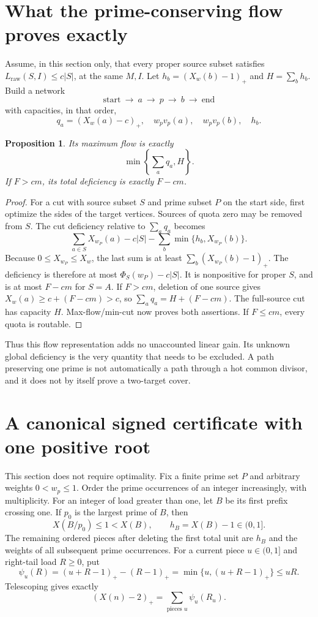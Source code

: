 \documentclass[11pt,a4paper]{article}
\newtheorem{proposition}[theorem]{Proposition}
\newcommand{\pos}[1]{(#1)_+}
\newcommand{\Ph}{\Phi}
\newcommand{\raw}{L_{\mathrm{raw}}}
\begin{document}
\section{What the prime-conserving flow proves exactly}
Assume, in this section only, that every proper source subset satisfies
\(\raw(S,I)\le c|S|\), at the same \(M,I\).
Let \(h_b=\pos{X_w(b)-1}\) and \(H=\sum_bh_b\).
Build a network
\[
 \text{start}\ \longrightarrow\ a\ \longrightarrow\ p\
 \longrightarrow\ b\ \longrightarrow\ \text{end}
\]
with capacities, in that order,
\[
 q_a=\pos{X_w(a)-c},\quad
 w_pv_p(a),\quad w_pv_p(b),\quad h_b.
\]
\begin{proposition}\label{prop:flow}
Its maximum flow is exactly
\[
 \min\left\{\sum_aq_a,H\right\}.
\]
If \(F>cm\), its total deficiency is exactly \(F-cm\).
\end{proposition}
\begin{proof}
For a cut with source subset \(S\) and prime subset \(P\) on the
start side, first optimize the sides of the target vertices.
Sources of quota zero may be removed from \(S\).
The cut deficiency relative to \(\sum_aq_a\) becomes
\[
 \sum_{a\in S}X_{w_P}(a)-c|S|
 -\sum_b\min\{h_b,X_{w_P}(b)\}.
\]
Because \(0\le X_{w_P}\le X_w\), the last sum is at least
\(\sum_b\pos{X_{w_P}(b)-1}\).
The deficiency is therefore at most
\(\Ph_S(w_P)-c|S|\). It is nonpositive for proper \(S\), and is
at most \(F-cm\) for \(S=A\).
If \(F>cm\), deletion of one source gives
\(X_w(a)\ge c+(F-cm)>c\), so
\(\sum_aq_a=H+(F-cm)\).
The full-source cut has capacity \(H\). Max-flow/min-cut now proves
both assertions. If \(F\le cm\), every quota is routable.
\end{proof}

Thus this flow representation adds no unaccounted linear gain.
Its unknown global deficiency is the very quantity that needs to be
excluded. A path preserving one prime is not automatically a path
through a hot common divisor, and it does not by itself prove a
two-target cover.

\section{A canonical signed certificate with one positive root}
This section does not require optimality. Fix a finite prime set \(P\)
and arbitrary weights \(0<w_p\le1\). Order the prime occurrences of
an integer increasingly, with multiplicity.
For an integer of load greater than one, let \(B\) be its first
prefix crossing one. If \(p_0\) is the largest prime of \(B\), then
\[
 X(B/p_0)\le1<X(B),\qquad h_B=X(B)-1\in(0,1].
 \tag{B}
\]
The remaining ordered pieces after deleting the first total unit are
\(h_B\) and the weights of all subsequent prime occurrences.
For a current piece \(u\in(0,1]\) and right-tail load \(R\ge0\), put
\[
 \psi_u(R)=\pos{u+R-1}-\pos{R-1}
          =\min\{u,\pos{u+R-1}\}\le uR.
 \tag{P}
\]
Telescoping gives exactly
\[
 \pos{X(n)-2}=\sum_{\text{pieces }u}\psi_u(R_u).
 \tag{T}
\]
\end{document}
